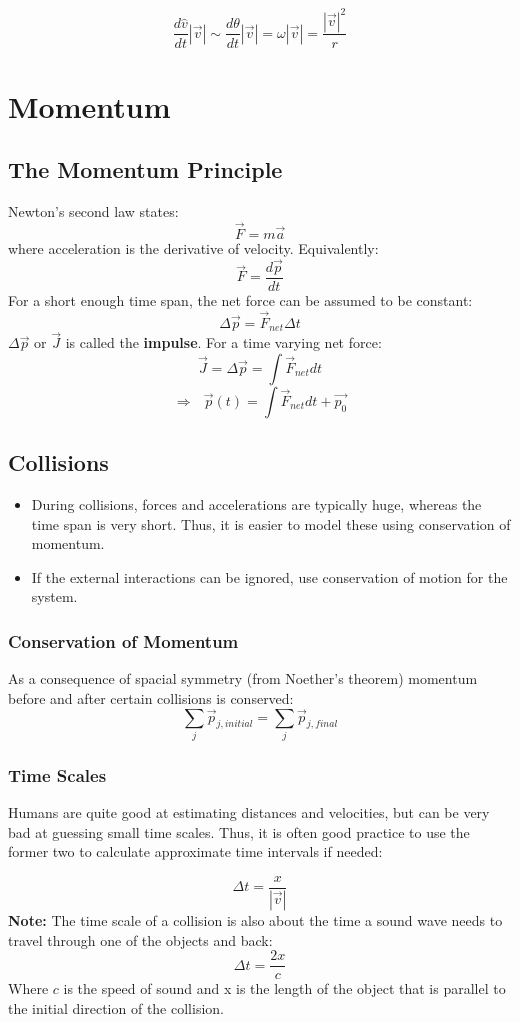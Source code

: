\documentclass{article}
\begin{document}
$$\frac{d\hat{v}}{dt}|\vec{v}| \sim \frac{d\theta}{dt}|\vec{v}|=\omega |\vec{v}|=\frac{|\vec{v}|^2}{r} $$
\pagebreak
\section{Momentum}
\subsection{The Momentum Principle}
Newton's second law states:
$$\vec{F}=m\vec{a}$$
where acceleration is the derivative of velocity. Equivalently:
$$\vec{F}=\frac{d\vec{p}}{dt}$$
For a short enough time span, the net force can be assumed to be constant:
$$\Delta \vec{p}=\vec{F}_{net}\Delta t$$
$\Delta \vec{p}$ or $\vec{J}$ is called the \textbf{impulse}. For a time varying net force:
$$\vec{J}=\Delta\vec{p}=\int \vec{F}_{net} dt$$
$$\Rightarrow \text{  }\vec{p}(t)=\int \vec{F}_{net}dt + \vec{p_0}$$
\subsection{Collisions}
\begin{itemize}
    \item During collisions, forces and accelerations are typically huge, whereas the time span is very short. Thus, it is easier to model these using conservation of momentum.
    \item If the external interactions can be ignored, use conservation of motion for the system.
\end{itemize}

\subsubsection{Conservation of Momentum} As a consequence of spacial symmetry (from Noether's theorem) momentum before and after certain collisions is conserved:
$$\sum \limits_{j} \vec{p}_{j,initial}=\sum \limits_j \vec{p}_{j,final}$$
\subsubsection{Time Scales}Humans are quite good at estimating distances and velocities, but can be very bad at guessing small time scales. Thus, it is often good practice to use the former two to calculate approximate time intervals if needed:

$$\Delta t= \frac{x}{|\vec{v}|}$$
\textbf{Note:} The time scale of a collision is also about the time a sound wave needs to travel through one of the objects and back:
$$\Delta t = \frac{2x}{c}$$
Where $c$ is the speed of sound and x is the length of the object that is parallel to the initial direction of the collision.
\end{document}
